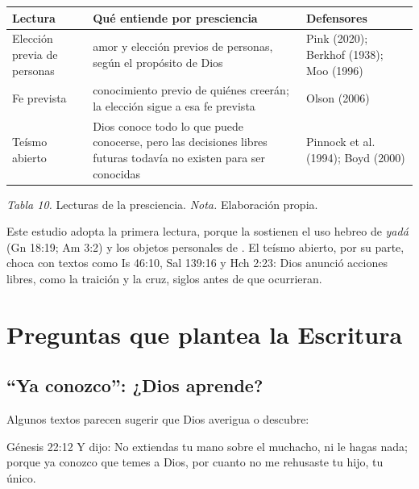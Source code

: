 \begin{center}\small\renewcommand{\arraystretch}{1.25}
\begin{tabular}{@{}L{2.8cm}L{7.0cm}L{4.6cm}@{}}
\toprule
\textbf{Lectura} & \textbf{Qué entiende por presciencia} & \textbf{Defensores} \\ \midrule
Elección previa de personas & amor y elección previos de personas, según el propósito de Dios & Pink (2020); Berkhof (1938); Moo (1996) \\
Fe prevista & conocimiento previo de quiénes creerán; la elección sigue a esa fe prevista & Olson (2006) \\
Teísmo abierto & Dios conoce todo lo que puede conocerse, pero las decisiones libres futuras todavía no existen para ser conocidas & Pinnock et al. (1994); Boyd (2000) \\
\bottomrule
\end{tabular}\par
{\footnotesize\color{gris}\textit{Tabla 10.} Lecturas de la presciencia. \textit{Nota.} Elaboración propia.}
\end{center}

Este estudio adopta la primera lectura, porque la sostienen el uso hebreo de \emph{yadá} (Gn 18:19; Am 3:2) y los objetos personales de . El teísmo abierto, por su parte, choca con textos como Is 46:10, Sal 139:16 y Hch 2:23: Dios anunció acciones libres, como la traición y la cruz, siglos antes de que ocurrieran.


\section{Preguntas que plantea la Escritura}

\subsection{“Ya conozco”: ¿Dios aprende?}
Algunos textos parecen sugerir que Dios averigua o descubre:

\begin{verso}{Génesis 22:12}
Y dijo: No extiendas tu mano sobre el muchacho, ni le hagas nada; porque ya conozco que temes a Dios, por cuanto no me rehusaste tu hijo, tu único.
\end{verso}

